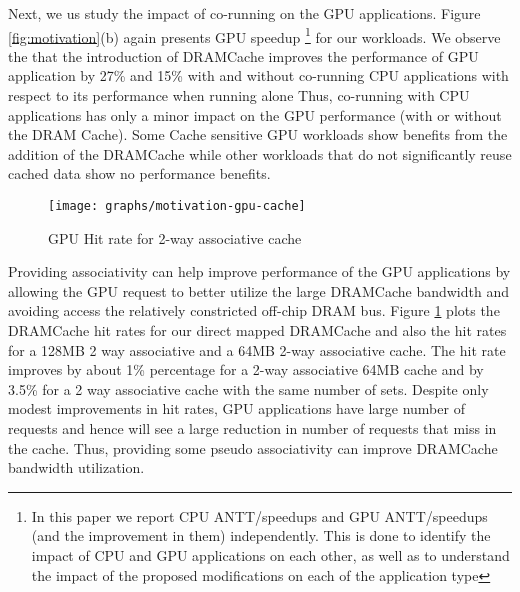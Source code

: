 \par Next, we us study the impact of co-running on the GPU applications.  Figure \ref{fig:motivation}(b) again presents GPU speedup \footnote{In this 
paper we report CPU ANTT/speedups and GPU ANTT/speedups (and the improvement in them) independently. This is done to identify the impact of CPU 
and GPU applications on each other, as well as to understand the impact of the proposed modifications on each of the application
type} 
for our workloads. 
We observe the that the introduction of DRAMCache improves the performance of GPU application by 27\% and 15\% with and without co-running CPU applications with respect to its performance when running alone
Thus,  co-running with CPU applications has only a minor impact on the GPU performance (with or without the DRAM Cache). 
Some Cache sensitive GPU workloads show benefits from the addition of the DRAMCache while other workloads that do not significantly reuse cached data show no performance benefits.
\begin{figure}[htbp]
   \texttt{[image: graphs/motivation-gpu-cache]}
   \caption{GPU Hit rate for 2-way associative cache}
   \label{fig:motivation-gpu-cache}
\end{figure}
Providing associativity can help improve performance of the GPU applications by allowing the GPU request to better utilize the large  DRAMCache bandwidth and avoiding access the relatively constricted off-chip DRAM bus. Figure \ref{fig:motivation-gpu-cache} plots the DRAMCache hit rates for our direct mapped DRAMCache and also the hit rates for a 128MB 2 way associative and a 64MB 2-way associative cache. The hit rate improves by about 1\% percentage for a 2-way associative 64MB cache and by 3.5\% for a 2 way associative cache with the same number of sets. Despite only modest improvements in hit rates, GPU applications have large number of requests and hence will see a large reduction in number of requests that miss in the cache. Thus, providing some pseudo associativity can improve DRAMCache bandwidth utilization.



